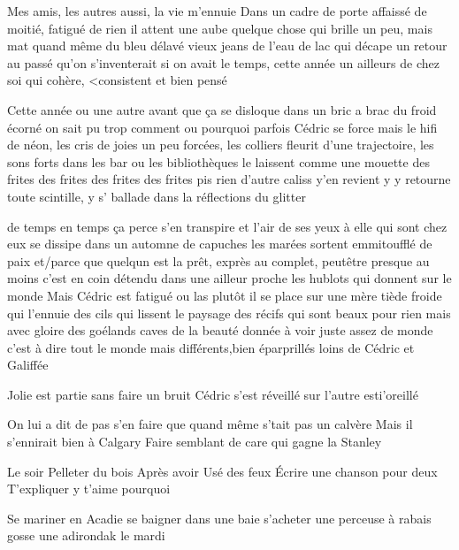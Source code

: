 Mes amis, les autres aussi,
la vie m'ennuie
Dans un cadre de porte
affaissé de moitié, fatigué
de rien il attent une aube
quelque chose qui brille
un peu, mais mat quand même
du bleu délavé vieux jeans
de l'eau de lac qui décape
un retour au passé qu'on s'inventerait
si on avait le temps, cette année
un ailleurs de chez soi 
qui cohère, <consistent et bien pensé

Cette année ou une autre
avant que ça se disloque
dans un bric a brac du froid écorné 
on sait pu trop comment ou pourquoi
parfois Cédric se force mais
le hifi de néon, les cris de joies
un peu forcées, les colliers fleurit
d'une trajectoire, les sons forts
dans les bar ou les bibliothèques
le laissent comme une mouette
des frites des frites des frites
des frites pis rien d'autre
caliss y'en revient y y retourne 
toute scintille, y s' ballade dans
la réflections du glitter

de temps en temps ça perce
s'en transpire et l'air
de ses yeux à elle qui sont
chez eux
se dissipe dans
un automne de capuches
les marées sortent
emmitoufflé de paix
et/parce que quelqun est la prêt, exprès
au complet, peutêtre 
presque au moins c'est en coin
détendu dans une ailleur proche
les hublots qui donnent sur le monde
Mais Cédric est fatigué
ou las plutôt
il se place sur une mère
tiède froide
qui l'ennuie
des cils qui lissent le paysage
des récifs qui sont beaux
pour rien mais avec gloire
des goélands caves
de la beauté donnée à voir
juste assez de monde
c'est à dire tout le monde
mais différents,bien éparprillés
loins de Cédric et Galiffée

Jolie est partie 
sans faire un bruit
Cédric s'est réveillé
sur l'autre esti'oreillé

On lui a dit de pas s'en faire
que quand même s'tait pas un calvère
Mais il s'ennirait bien à Calgary
Faire semblant de care qui gagne la Stanley

Le soir Pelleter du bois
Après avoir Usé des feux
Écrire une chanson pour deux
T'expliquer y t'aime pourquoi

Se mariner en Acadie 
se baigner dans une baie
s'acheter une perceuse à rabais
gosse une adirondak le mardi





